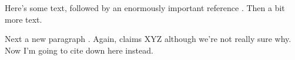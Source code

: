 \documentclass{article}
\begin{document}
Here's some text, followed by an enormously important reference
\cite<here I am obligated to cite>[even though it's not really
necessary]{small}.  Then a bit more text.

Next a new paragraph \cite{big}.  Again,  claims XYZ
although we're not really sure why.  Now I'm going to cite
 down here instead.



\end{document}
